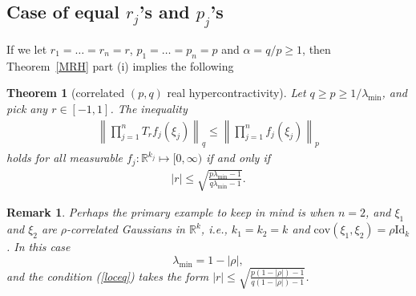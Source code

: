 \documentclass[9pt, a4paper]{amsart}
\newcommand{\1}{{\chi_{}}}%
\newtheorem{theorem}{Theorem}
\newtheorem{corollary}{Corollary}
\newtheorem{remark}{Remark}
\numberwithin{equation}{section}
\begin{document}
 

 





\subsection{Case of equal $r_{j}$'s and $p_{j}$'s}

If we let  $r_{1}=\ldots=r_{n}=r$, $p_{1}=\ldots=p_{n}=p$ and $\alpha=q/p\geq 1$, then  Theorem~\ref{MRH} part (i) implies the following
\begin{theorem}[correlated $(p,q)$ real hypercontractivity]\label{correal}
   Let $q\geq p \geq 1/\lambda_{\min}$, and pick any $r \in [-1,1]$. The inequality 
   \begin{align}\label{correalFun}
       \left\|\prod_{j=1}^{n} T_{r}f_{j}(\xi_{j})\right\|_{q} \leq \left\|\prod_{j=1}^{n} f_{j}(\xi_{j})\right\|_{p}
   \end{align}
   holds for all measurable $f_{j} :\mathbb{R}^{k_{j}}\mapsto [0, \infty)$ if and only if 
   \begin{align}\label{loceq}
       |r|\leq \sqrt{\frac{p\lambda_{\min}-1}{q\lambda_{\min}-1}}. 
   \end{align}
\end{theorem}

\begin{remark}
    Perhaps the primary example to keep in mind is when $n=2$, and $\xi_{1}$ and $\xi_{2}$ are $\rho$-correlated Gaussians in $\mathbb{R}^{k}$, i.e., $k_{1}=k_{2}=k$ and $\mathrm{cov}(\xi_{1}, \xi_{2})=\rho \mathrm{Id}_{k}$. In this case
    $$
    \lambda_{\min}=1-|\rho|,
    $$
    and the condition (\ref{loceq}) takes the form $|r|\leq \sqrt{\frac{p(1-|\rho|)-1}{q(1-|\rho|)-1}}$. 
    \end{remark}




\end{document}

